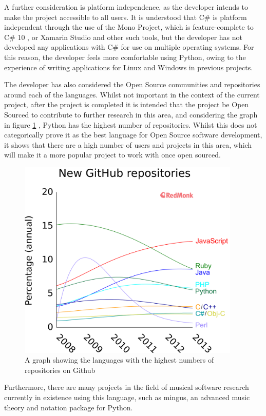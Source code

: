 A further consideration is platform independence, as the developer intends to make the project accessible to all users. It is understood that C\# is platform independent through the use of the Mono Project, which is feature-complete to C\# 10 \parencite{MonoDev}, or Xamarin Studio and other such tools, but the developer has not developed any applications with C\# for use on multiple operating systems. For this reason, the developer feels more comfortable using Python, owing to the experience of writing applications for Linux and Windows in previous projects. 

The developer has also considered the Open Source communities and repositories around each of the languages. Whilst not important in the context of the current project, after the project is completed it is intended that the project be Open Sourced to contribute to further research in this area, and considering the graph in figure \ref{fig:graph} \parencite{Redmonk}, Python has the highest number of repositories. Whilst this does not categorically prove it as the best language for Open Source software development, it shows that there are a high number of users and projects in this area, which will make it a more popular project to work with once open sourced.

\begin{figure}[H]
\centering
\includegraphics[width=300pt]{github-repos}
\caption{A graph showing the languages with the highest numbers of repositories on Github}	
\label{fig:graph}
\end{figure}

Furthermore, there are many projects in the field of musical software research currently in existence using this language, \parencite{pmus} such as mingus, an advanced music theory and notation package for Python.

